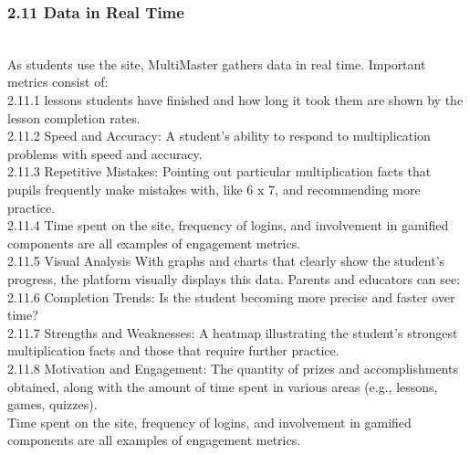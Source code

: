 \documentclass[BTech]{audiss}
\begin{document}
\subsubsection{2.11 Data in Real Time}\\
As students use the site, MultiMaster gathers data in real time. Important metrics consist of:\\
2.11.1 lessons students have finished and how long it took them are shown by the lesson completion rates.\\
2.11.2 Speed and Accuracy: A student's ability to respond to multiplication problems with speed and accuracy.\\
2.11.3 Repetitive Mistakes: Pointing out particular multiplication facts that pupils frequently make mistakes with, like 6 x 7, and recommending more practice.\\
2.11.4 Time spent on the site, frequency of logins, and involvement in gamified components are all examples of engagement metrics.\\
2.11.5 Visual Analysis With graphs and charts that clearly show the student's progress, the platform visually displays this data. Parents and educators can see:\\
2.11.6 Completion Trends: Is the student becoming more precise and faster over time? \\
2.11.7 Strengths and Weaknesses: A heatmap illustrating the student's strongest multiplication facts and those that require further practice.\\
2.11.8 Motivation and Engagement: The quantity of prizes and accomplishments obtained, along with the amount of time spent in various areas (e.g., lessons, games, quizzes). \\

Time spent on the site, frequency of logins, and involvement in gamified components are all examples of engagement metrics.
\end{document}
